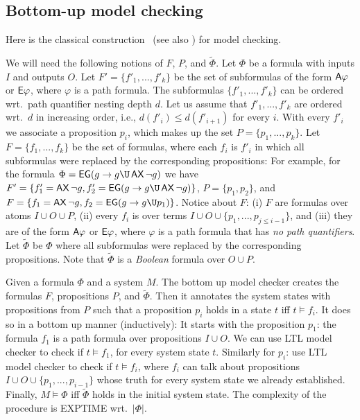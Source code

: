 \subsection*{Bottom-up \CTLstar model checking}\label{page:defs:bottom-up-mc}

Here is the classical construction~\cite{DBLP:journals/toplas/ClarkeES86}
(see also \cite[p.427]{PrinciplesMC})
for \CTLstar model checking.

We will need the following notions of $F$, $P$, and $\widetilde\Phi$.
Let $\Phi$ be a \CTLstar formula with inputs $I$ and outputs $O$.
Let $F'=\{f'_1,...,f'_k\}$ be the set of \CTLstar subformulas of the form ${\operatorname{\mathsf{A}}}\varphi$ or ${\operatorname{\mathsf{E}}}\varphi$,
where $\varphi$ is a path formula.
The subformulas $\{f'_1,...,f'_k\}$ can be ordered wrt.\ path quantifier nesting depth $d$.
Let us assume that $f'_1,...,f'_k$ are ordered wrt.\ $d$ in increasing order,
i.e., $d(f'_i) \leq d(f'_{i+1})$ for every $i$.
With every $f'_i$ we associate a proposition $p_i$,
which makes up the set $P=\{p_1,...,p_k\}$.
Let $F=\{f_1,...,f_k\}$ be the set of formulas,
where each $f_i$ is $f'_i$ in which all subformulas were replaced by the corresponding propositions:
For example,
for the \CTLstar formula $\Phi=\EG(g \impl g \U \AX\neg g)$ we have
$F'=\{ f'_1=\AX\neg g, f'_2=\EG(g \impl g \U \AX\neg g) \}$,
$P=\{p_1, p_2\}$, and
$F=\{ f_1=\AX\neg g, f_2=\EG(g \impl g \U p_1) \}$.
Notice about $F$:
(i) $F$ are formulas over atoms $I\cup O\cup P$,
(ii) every $f_i$ is over terms $I \cup O \cup \{p_1,...,p_{j\leq i-1}\}$, and
(iii) they are of the form ${\operatorname{\mathsf{A}}}\varphi$ or ${\operatorname{\mathsf{E}}}\varphi$,
where $\varphi$ is a \CTLstar path formula that has \emph{no path quantifiers}.
Let $\widetilde\Phi$ be $\Phi$ where all subformulas were replaced by the corresponding propositions.
Note that $\widetilde\Phi$ is a \emph{Boolean} formula over $O\cup P$.

Given a \CTLstar formula $\Phi$ and a system $M$.
The bottom up model checker creates the formulas $F$, propositions $P$, and $\widetilde\Phi$.
Then it annotates the system states with propositions from $P$ such that
a proposition $p_i$ holds in a state $t$ iff $t \models f_i$.
It does so in a bottom up manner (inductively):
\li
\- It starts with the proposition $p_1$:
   the formula $f_1$ is a path formula over propositions $I\cup O$.
   We can use LTL model checker to check if $t \models f_1$,
   for every system state $t$.
\- Similarly for $p_i$:
   use LTL model checker to check if $t \models f_i$,
   where $f_i$ can talk about propositions $I \cup O \cup \{p_1,...,p_{i-1}\}$
   whose truth for every system state we already established.
\- Finally, $M \models \Phi$ iff $\widetilde\Phi$ holds in the initial system state.
\il
The complexity of the procedure is EXPTIME wrt.\ $|\Phi|$.


